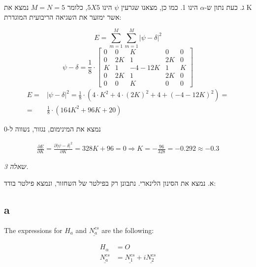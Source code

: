 \documentclass[a4paper]{iacas}
\begin{document}
\begin{hebrew}
ג. כעת נתון ש-$\alpha$ הינו 1. כמו כן, מצאנו שגרעין $\psi$ הינו $5X5$, כלומר $M=N=5$ נמצא את K אשר ימזער את השגיאה הריבועית המוגדרת:
\end{hebrew}
\begin{equation*}
E = \sum_{m=1}^M \sum_{m=1}^M |\psi -\delta|^2
\end{equation*}
\begin{equation*}
\psi -\delta  = \frac{1}{8} \cdot \begin{bmatrix}0&0&K&0&0\\0&2K&1&2K&0\\K&1&-4-12K&1&K\\0&2K&1&2K&0\\0&0&K&0&0\end{bmatrix}
\end{equation*}
\begin{align*}
E =& |\psi -\delta|^2 =  \frac{1}{8} \cdot ( 4\cdot K^2 + 4\cdot (2K)^2 + 4 + (-4-12K)^2 ) = \\
=& \frac{1}{8} \cdot ( 164K^2 + 96K + 20 )
\end{align*}
\begin{hebrew}
נמצא את המינימום, נגזור, נשווה ל-0
\end{hebrew}
\begin{align*}
\frac{\partial E}{\partial K} = \frac{\partial{|\psi -\delta|^2}}{\partial K} =  328K + 96 = 0 \Longrightarrow K = -\frac{96}{328} = -0.292 \approx -0.3
\end{align*}



\newpage
\begin{hebrew}
\textit{\huge שאלה 3.}

א. נמצא את הסינון הלינארי. נתבונן רק בפילטר של השחזור, ונמצא פילטר בודד:
\end{hebrew}

\newcommand{\NAcs}{\underline{N_a^{cs}}}
\newcommand{\Nrcs}{\underline{N_1^{cs}}}
\newcommand{\Nics}{\underline{N_2^{cs}}}


\subsection{a}
The expressions for $H_a$ and $\underline{N_a^{cs}}$ are the following:

\begin{align*}
H_\alpha &= O \\
\NAcs &= \Nrcs + i\Nics
\end{align*}
\end{document}
